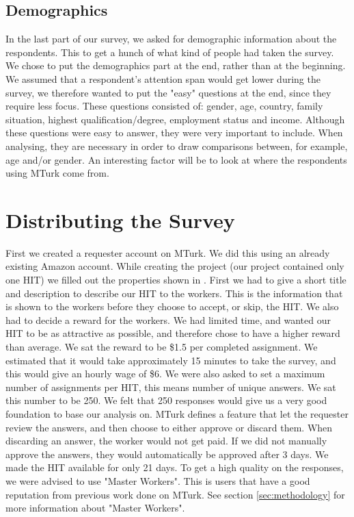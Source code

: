 \subsection{Demographics}
In the last part of our survey, we asked for demographic information about the respondents. This to get a hunch of what kind of people had taken the survey. We chose to put the demographics part at the end, rather than at the beginning. We assumed that a respondent's attention span would get lower during the survey, we therefore wanted to put the "easy" questions at the end, since they require less focus. These questions consisted of: gender, age, country, family situation, highest qualification/degree, employment status and income. Although these questions were easy to answer, they were very important to include. When analysing, they are necessary in order to draw comparisons between, for example, age and/or gender. An interesting factor will be to look at where the respondents using MTurk come from.  

\section{Distributing the Survey}


First we created a requester account on MTurk. We did this using an already existing Amazon account. While creating the project (our project contained only one HIT) we filled out the properties shown in . First we had to give a short title and description to describe our HIT to the workers. This is the information that is shown to the workers before they choose to accept, or skip, the HIT. We also had to decide a reward for the workers. We had limited time, and wanted our HIT to be as attractive as possible, and therefore chose to have a higher reward than average. We sat the reward to be \$1.5 per completed assignment. We estimated that it would take approximately 15 minutes to take the survey, and this would give an hourly wage of \$6. We were also asked to set a maximum number of assignments per HIT, this means number of unique answers. We sat this number to be 250. We felt that 250 responses would give us a very good foundation to base our analysis on. MTurk defines a feature that let the requester review the answers, and then choose to either approve or discard them. When discarding an answer, the worker would not get paid. If we did not manually approve the answers, they would automatically be approved after 3 days. We made the HIT available for only 21 days. To get a high quality on the responses, we were advised to use "Master Workers". This is users that have a good reputation from previous work done on MTurk. See section \ref{sec:methodology} for more information about "Master Workers". 

